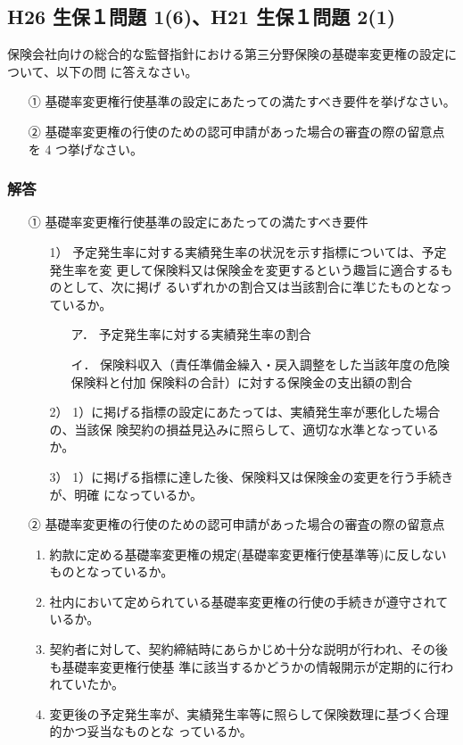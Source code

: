 \documentclass[report,gutter=10mm,fore-edge=10mm,uplatex,dvipdfmx]{jlreq}
\begin{document}
\subsection{H26 生保１問題 1(6)、H21 生保１問題 2(1)}

保険会社向けの総合的な監督指針における第三分野保険の基礎率変更権の設定について、以下の問
に答えなさい。
\begin{itemize}
 \item [①]基礎率変更権行使基準の設定にあたっての満たすべき要件を挙げなさい。
 \item [②]基礎率変更権の行使のための認可申請があった場合の審査の際の留意点を 4 つ挙げなさい。
\end{itemize}

\subsubsection{解答}

\begin{itemize}
 \item [①]基礎率変更権行使基準の設定にあたっての満たすべき要件
\begin{enumerate}
 \item [1）]予定発生率に対する実績発生率の状況を示す指標については、予定発生率を変
更して保険料又は保険金を変更するという趣旨に適合するものとして、次に掲げ
るいずれかの割合又は当該割合に準じたものとなっているか。
\begin{itemize}
 \item [ア．]予定発生率に対する実績発生率の割合
 \item [イ．]保険料収入（責任準備金繰入・戻入調整をした当該年度の危険保険料と付加
保険料の合計）に対する保険金の支出額の割合
\end{itemize}
 \item [2）]1）に掲げる指標の設定にあたっては、実績発生率が悪化した場合の、当該保
険契約の損益見込みに照らして、適切な水準となっているか。
 \item [3）]1）に掲げる指標に達した後、保険料又は保険金の変更を行う手続きが、明確
になっているか。
\end{enumerate}
 \item [②]基礎率変更権の行使のための認可申請があった場合の審査の際の留意点
\begin{enumerate}
 \item 約款に定める基礎率変更権の規定(基礎率変更権行使基準等)に反しないものとなっているか。
 \item 社内において定められている基礎率変更権の行使の手続きが遵守されているか。
 \item  契約者に対して、契約締結時にあらかじめ十分な説明が行われ、その後も基礎率変更権行使基
 準に該当するかどうかの情報開示が定期的に行われていたか。
 \item  変更後の予定発生率が、実績発生率等に照らして保険数理に基づく合理的かつ妥当なものとな
っているか。
\end{enumerate}
\end{itemize}
\end{document}
